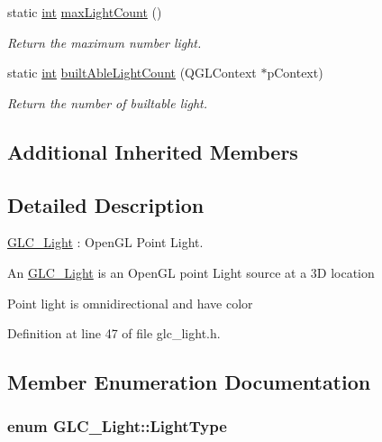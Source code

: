 \begin{DoxyCompactItemize}
static \hyperlink{ioapi_8h_a787fa3cf048117ba7123753c1e74fcd6}{int} \hyperlink{class_g_l_c___light_add55fbb82c37f021ba9422bbda089f36}{max\-Light\-Count} ()
\begin{DoxyCompactList}\small\item\em Return the maximum number light. \end{DoxyCompactList}\item 
static \hyperlink{ioapi_8h_a787fa3cf048117ba7123753c1e74fcd6}{int} \hyperlink{class_g_l_c___light_a644b0c6b07a93646802b79a7b646075d}{built\-Able\-Light\-Count} (Q\-G\-L\-Context $\ast$p\-Context)
\begin{DoxyCompactList}\small\item\em Return the number of builtable light. \end{DoxyCompactList}\end{DoxyCompactItemize}
\subsection*{Additional Inherited Members}


\subsection{Detailed Description}
\hyperlink{class_g_l_c___light}{G\-L\-C\-\_\-\-Light} \-: Open\-G\-L Point Light. 

An \hyperlink{class_g_l_c___light}{G\-L\-C\-\_\-\-Light} is an Open\-G\-L point Light source at a 3\-D location\par
 Point light is omnidirectional and have color 

Definition at line 47 of file glc\-\_\-light.\-h.



\subsection{Member Enumeration Documentation}
\hypertarget{class_g_l_c___light_a3b07c40e07008c58c5da29ccabfef6a6}{
\subsubsection[{Light\-Type}]{\setlength{\rightskip}{0pt plus 5cm}enum {\bf G\-L\-C\-\_\-\-Light\-::\-Light\-Type}}}\label{class_g_l_c___light_a3b07c40e07008c58c5da29ccabfef6a6}


